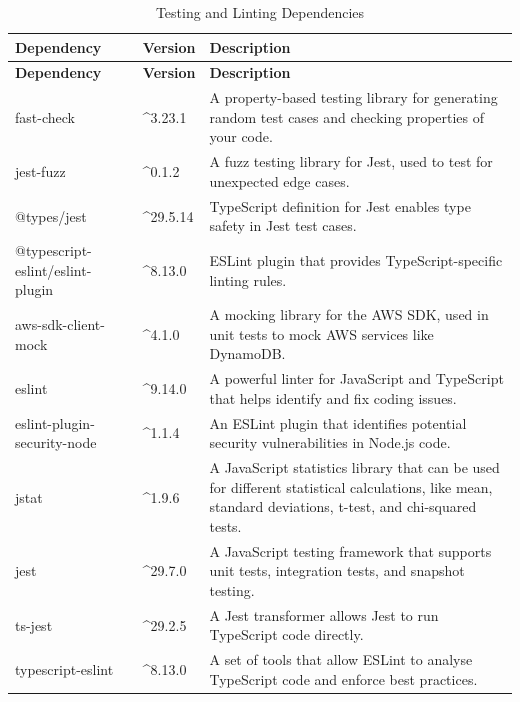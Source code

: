 \begin{longtable}{|l|l|p{8cm}|}
\caption{Testing and Linting Dependencies}
\label{table:lint_testing_dependencies}
\hline
\rowcolor{grey!15}
\textbf{Dependency} & \textbf{Version} & \textbf{Description} \\
\endfirsthead
\hline
\rowcolor{grey!15}
\textbf{Dependency} & \textbf{Version} & \textbf{Description} \\
\endhead
\endfoot
\hline
\endlastfoot
fast-check & \textasciicircum 3.23.1 & A property-based testing library for generating random test cases and checking properties of your code. \\
\hline
jest-fuzz & \textasciicircum 0.1.2 & A fuzz testing library for Jest, used to test for unexpected edge cases. \\
\hline
@types/jest & \textasciicircum 29.5.14 & TypeScript definition for Jest enables type safety in Jest test cases. \\
\hline
@typescript-eslint/eslint-plugin & \textasciicircum 8.13.0 & ESLint plugin that provides TypeScript-specific linting rules. \\
\hline
aws-sdk-client-mock & \textasciicircum 4.1.0 & A mocking library for the AWS SDK, used in unit tests to mock AWS services like DynamoDB. \\
\hline
eslint & \textasciicircum 9.14.0 & A powerful linter for JavaScript and TypeScript that helps identify and fix coding issues. \\
\hline
eslint-plugin-security-node & \textasciicircum 1.1.4 & An ESLint plugin that identifies potential security vulnerabilities in Node.js code. \\
\hline
jstat & \textasciicircum 1.9.6 & A JavaScript statistics library that can be used for different statistical calculations, like mean, standard deviations, t-test, and chi-squared tests. \\
\hline
jest & \textasciicircum 29.7.0 & A JavaScript testing framework that supports unit tests, integration tests, and snapshot testing. \\
\hline
ts-jest & \textasciicircum 29.2.5 & A Jest transformer allows Jest to run TypeScript code directly. \\
\hline
typescript-eslint & \textasciicircum 8.13.0 & A set of tools that allow ESLint to analyse TypeScript code and enforce best practices. \\
\hline
\end{longtable}

